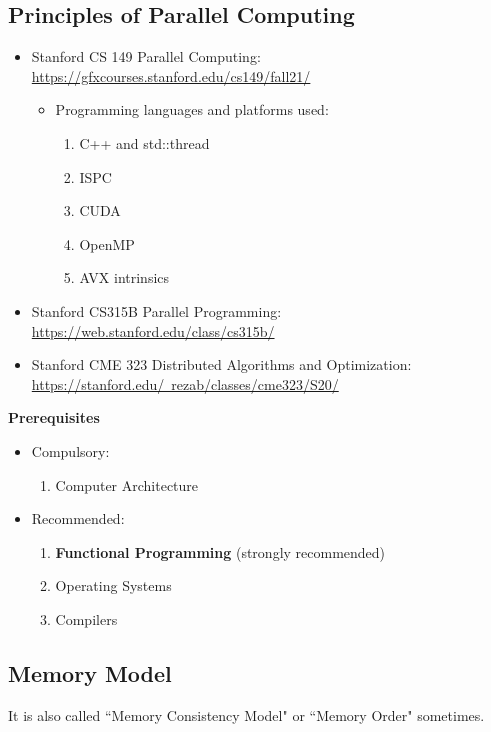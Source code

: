 \documentclass{article}
\begin{document}
\subsection{Principles of Parallel Computing}
\begin{itemize}
    \item Stanford CS 149 Parallel Computing:
    \href{https://gfxcourses.stanford.edu/cs149/fall21/}{https://gfxcourses.stanford.edu/cs149/fall21/}
    \begin{itemize}
        \item Programming languages and platforms used:
        \begin{enumerate}
            \item C++ and std::thread
            \item ISPC
            \item CUDA
            \item OpenMP
            \item AVX intrinsics
        \end{enumerate}
    \end{itemize}
    \item Stanford CS315B Parallel Programming:\\
    \href{https://web.stanford.edu/class/cs315b/}{https://web.stanford.edu/class/cs315b/}
    \item Stanford CME 323 Distributed Algorithms and Optimization:\\
    \href{https://stanford.edu/~rezab/classes/cme323/S20/}{https://stanford.edu/~rezab/classes/cme323/S20/}
\end{itemize}
\textbf{Prerequisites}
    \begin{itemize}
        \item Compulsory:
        \begin{enumerate}
        \item Computer Architecture
    \end{enumerate}
        \item Recommended:
        \begin{enumerate}
            \item \textbf{Functional Programming} (strongly recommended)
            \item Operating Systems
            \item Compilers
        \end{enumerate}
    \end{itemize}

\subsection{Memory Model}
It is also called ``Memory Consistency Model" or ``Memory Order" sometimes.
\end{document}
